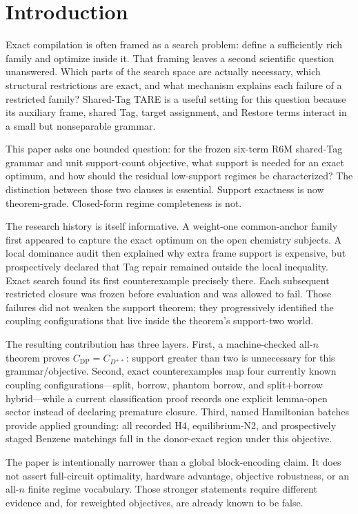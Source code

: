 \section{Introduction}

Exact compilation is often framed as a search problem: define a sufficiently rich family and optimize inside it. That framing leaves a second scientific question unanswered. Which parts of the search space are actually necessary, which structural restrictions are exact, and what mechanism explains each failure of a restricted family? Shared-Tag TARE is a useful setting for this question because its auxiliary frame, shared Tag, target assignment, and Restore terms interact in a small but nonseparable grammar.

This paper asks one bounded question: for the frozen six-term R6M shared-Tag grammar and unit support-count objective, what support is needed for an exact optimum, and how should the residual low-support regimes be characterized? The distinction between those two clauses is essential. Support exactness is now theorem-grade. Closed-form regime completeness is not.

The research history is itself informative. A weight-one common-anchor family first appeared to capture the exact optimum on the open chemistry subjects. A local dominance audit then explained why extra frame support is expensive, but prospectively declared that Tag repair remained outside the local inequality. Exact search found its first counterexample precisely there. Each subsequent restricted closure was frozen before evaluation and was allowed to fail. Those failures did not weaken the support theorem; they progressively identified the coupling configurations that live inside the theorem's support-two world.

The resulting contribution has three layers. First, a machine-checked all-$n$ theorem proves $C_{\mathrm{DP}}=C_{D^{++}}$: support greater than two is unnecessary for this grammar/objective. Second, exact counterexamples map four currently known coupling configurations---split, borrow, phantom borrow, and split+borrow hybrid---while a current classification proof records one explicit lemma-open sector instead of declaring premature closure. Third, named Hamiltonian batches provide applied grounding: all recorded H4, equilibrium-N2, and prospectively staged Benzene matchings fall in the donor-exact region under this objective.

The paper is intentionally narrower than a global block-encoding claim. It does not assert full-circuit optimality, hardware advantage, objective robustness, or an all-$n$ finite regime vocabulary. Those stronger statements require different evidence and, for reweighted objectives, are already known to be false.